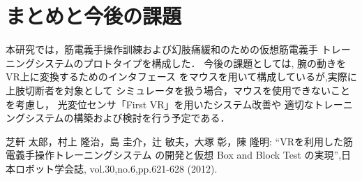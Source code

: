 \documentclass[11pt]{ltjsarticle}
\begin{document}
\section{まとめと今後の課題}
	本研究では，筋電義手操作訓練および幻肢痛緩和のための仮想筋電義手
	トレーニングシステムのプロトタイプを構成した．
	今後の課題としては, 腕の動きをVR上に変換するためのインタフェース
	をマウスを用いて構成しているが,実際に上肢切断者を対象として
	シミュレータを扱う場合，マウスを使用できないことを考慮し，
	光変位センサ「First VR」を用いたシステム改善や
	適切なトレーニングシステムの構築および検討を行う予定である．
\begin{thebibliography}{99}%
	芝軒 太郎，村上 隆治，島 圭介，辻 敏夫，大塚 彰，陳 隆明:
	``VRを利用した筋電義手操作トレーニングシステム
	の開発と仮想 Box and Block Test の実現'',日本ロボット学会誌,
	vol.30,no.6,pp.621-628 (2012).

\end{thebibliography}
\end{document}
